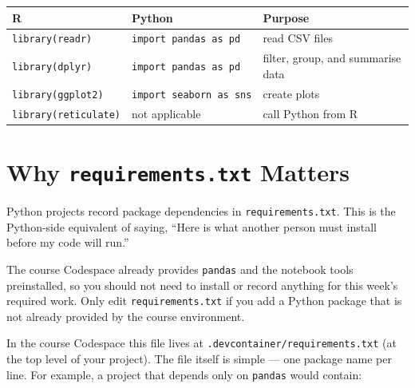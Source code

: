 \documentclass[
  letterpaper,
  DIV=11,
  numbers=noendperiod,
  oneside]{scrreprt}
\begin{document}
\begin{longtable}[]{@{}
  >{\raggedright\arraybackslash}p{}
  >{\raggedright\arraybackslash}p{}
  >{\raggedright\arraybackslash}p{}@{}}
\toprule\noalign{}
\begin{minipage}[b]{\linewidth}\raggedright
R
\end{minipage} & \begin{minipage}[b]{\linewidth}\raggedright
Python
\end{minipage} & \begin{minipage}[b]{\linewidth}\raggedright
Purpose
\end{minipage} \\
\midrule\noalign{}
\endhead
\bottomrule\noalign{}
\endlastfoot
\texttt{library(readr)} & \texttt{import\ pandas\ as\ pd} & read CSV
files \\
\texttt{library(dplyr)} & \texttt{import\ pandas\ as\ pd} & filter,
group, and summarise data \\
\texttt{library(ggplot2)} & \texttt{import\ seaborn\ as\ sns} & create
plots \\
\texttt{library(reticulate)} & not applicable & call Python from R \\
\end{longtable}

\section{\texorpdfstring{Why \texttt{requirements.txt}
Matters}{Why requirements.txt Matters}}\label{why-requirements.txt-matters}

Python projects record package dependencies in
\texttt{requirements.txt}. This is the Python-side equivalent of saying,
``Here is what another person must install before my code will run.''

The course Codespace already provides \texttt{pandas} and the notebook
tools preinstalled, so you should not need to install or record anything
for this week's required work. Only edit \texttt{requirements.txt} if
you add a Python package that is not already provided by the course
environment.

In the course Codespace this file lives at
\texttt{.devcontainer/requirements.txt} (at the top level of your
project). The file itself is simple --- one package name per line. For
example, a project that depends only on \texttt{pandas} would contain:
\end{document}
